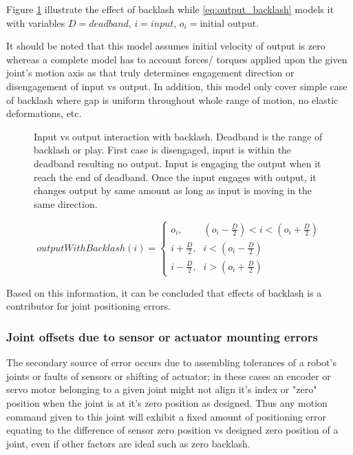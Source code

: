 \documentclass[english, printversion, nomenclature, notitle]{tuvisionthesis} %
\begin{document}
Figure \ref{fig:backlash} illustrate the effect of backlash while \cref{eq:output_backlash} models it with variables $D = deadband$, $i = input$, $o_i = \text{initial output}$. 

It should be noted that this model assumes initial velocity of output is zero whereas a complete model has to account forces/ torques applied upon the given joint's motion axis as that truly determines engagement direction or disengagement of input vs output. In addition, this model only cover simple case of backlash where gap is uniform throughout whole range of motion, no elastic deformations, etc.

\begin{figure}
	\def\svgwidth{\linewidth}
	
	\caption{Input vs output interaction with backlash. Deadband is the range of backlash or play. First case is disengaged, input is within the deadband resulting no output. Input is engaging the output when it reach the end of deadband. Once the input engages with output, it changes output by same amount as long as input is moving in the same direction.}
	\label{fig:backlash}
\end{figure}

\begin{equation}
outputWithBacklash(i) = \begin{cases}
\mbox{$o_i$,} & (o_i - \frac{D}{2}) < i < (o_i + \frac{D}{2}) \\
\mbox{$i + \frac{D}{2}$,} & i < (o_i - \frac{D}{2}) \\
\mbox{$i - \frac{D}{2}$,} & i > (o_i + \frac{D}{2})
\end{cases}
\label{eq:output_backlash}
\end{equation}

Based on this information, it can be concluded that effects of backlash is a contributor for joint positioning errors.

\subsubsection{Joint offsets due to sensor or actuator mounting errors}

The secondary source of error occurs due to assembling tolerances of a robot's joints or faults of sensors or shifting of actuator; in these cases an encoder or servo motor belonging to a given joint might not align it's index or "zero" position when the joint is at it's zero position as designed. Thus any motion command given to this joint will exhibit a fixed amount of positioning error equating to the difference of sensor zero position vs designed zero position of a joint, even if other factors are ideal such as zero backlash.
\end{document}

